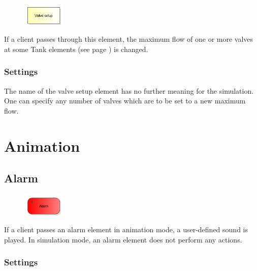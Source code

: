 \begin{figure}
\vspace{-22pt}
\includegraphics[width=2cm]{imageModelElementTankValveSetup.png}
\vspace{-22pt}
\end{figure}

If a client passes through this element, the maximum flow of one or more valves
at some Tank elements (see page \pageref{ref:ModelElementTank}) is changed.

\subsection*{Settings}

The name of the valve setup element has no further meaning for the simulation.
One can specify any number of valves which are to be set to a new maximum flow.





\chapter{Animation}

\section{Alarm}
\label{ref:ModelElementAnimationAlarm}

\begin{figure}
\vspace{-22pt}
\includegraphics[width=2cm]{imageModelElementAnimationAlarm.png}
\vspace{-22pt}
\end{figure}

If a client passes an alarm element in animation mode, a user-defined sound is played.
In simulation mode, an alarm element does not perform any actions.

\subsection*{Settings}

